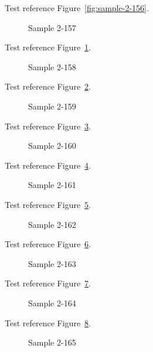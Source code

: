 Test reference Figure~\ref{fig:sample-2-156}.

\begin{figure}[tbhp]
\caption{Sample 2-157}
\label{fig:sample-2-157}
\end{figure}

Test reference Figure~\ref{fig:sample-2-157}.

\begin{figure}[tbhp]
\caption{Sample 2-158}
\label{fig:sample-2-158}
\end{figure}

Test reference Figure~\ref{fig:sample-2-158}.

\begin{figure}[tbhp]
\caption{Sample 2-159}
\label{fig:sample-2-159}
\end{figure}

Test reference Figure~\ref{fig:sample-2-159}.

\begin{figure}[tbhp]
\caption{Sample 2-160}
\label{fig:sample-2-160}
\end{figure}

Test reference Figure~\ref{fig:sample-2-160}.

\begin{figure}[tbhp]
\caption{Sample 2-161}
\label{fig:sample-2-161}
\end{figure}

Test reference Figure~\ref{fig:sample-2-161}.

\begin{figure}[tbhp]
\caption{Sample 2-162}
\label{fig:sample-2-162}
\end{figure}

Test reference Figure~\ref{fig:sample-2-162}.

\begin{figure}[tbhp]
\caption{Sample 2-163}
\label{fig:sample-2-163}
\end{figure}

Test reference Figure~\ref{fig:sample-2-163}.

\begin{figure}[tbhp]
\caption{Sample 2-164}
\label{fig:sample-2-164}
\end{figure}

Test reference Figure~\ref{fig:sample-2-164}.

\begin{figure}[tbhp]
\caption{Sample 2-165}
\label{fig:sample-2-165}
\end{figure}

